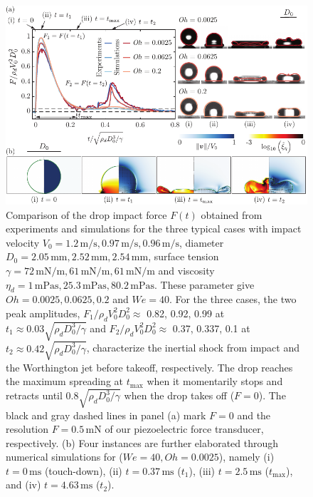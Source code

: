 \documentclass{jfm}
\newcommand{\oo}{\color{magenta} \normalfont}
\begin{document}
\begin{figure}
	\centering
	\includegraphics[width=\textwidth]{Figures/Figure1_summary_v6.pdf}
	\caption{{\oo Comparison of the drop impact force $F(t)$ obtained from experiments and simulations for the three typical cases with impact velocity $V_0 = 1.2\,\si{\meter}/\si{\second}, 0.97\,\si{\meter}/\si{\second}, 0.96\,\si{\meter}/\si{\second}$, diameter $D_0 = 2.05\,\si{\milli\meter}, 2.52\,\si{\milli\meter}, 2.54\,\si{\milli\meter}$, surface tension $\gamma = 72\,\si{\milli\newton}/\si{\meter}, 61\,\si{\milli\newton}/\si{\meter}, 61\,\si{\milli\newton}/\si{\meter}$ and viscosity $\eta_d = 1\,\si{\milli\pascal\second}, 25.3\,\si{\milli\pascal\second}, 80.2\,\si{\milli\pascal\second}$. These parameter give $Oh = 0.0025, 0.0625, 0.2$ and $We = 40$.
	For the three cases, the two peak amplitudes, $F_1/\rho_dV_0^2D_0^2 \approx$ 0.82, 0.92, 0.99 at $t_1 \approx 0.03\sqrt{\rho_dD_0^3/\gamma}$ and $F_2/\rho_dV_0^2D_0^2 \approx$ 0.37, 0.337, 0.1 at $t_2 \approx 0.42\sqrt{\rho_dD_0^3/\gamma}$, characterize the inertial shock from impact and the Worthington jet before takeoff, respectively. 
	The drop reaches the maximum spreading at $t_{\text{max}}$ when it momentarily stops and retracts until $0.8\sqrt{\rho_dD_0^3/\gamma}$ when the drop takes off ($F = 0$). The black and gray dashed lines in panel (a) mark $F = 0$ and the resolution $F = 0.5\,\si{\milli\newton}$ of our piezoelectric force transducer, respectively.
	(b) Four instances are further elaborated through numerical simulations for ($We = 40, Oh = 0.0025$), namely (i) $t = 0\,\si{\milli\second}$ (touch-down), (ii) $t = 0.37\,\si{\milli\second}$ ($t_1$), (iii) $t = 2.5\,\si{\milli\second}$ ($t_{\text{max}}$), and (iv) $t = 4.63\,\si{\milli\second}$ ($t_2$).
}}
\end{figure}
\end{document}
